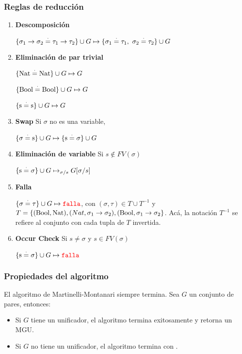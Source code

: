 \subsubsection{Reglas de reducción}

\begin{enumerate}
\item \textbf{Descomposición}

$\{\sigma_1\to\sigma_2 \overset{\cdot}{=}\tau_1\to\tau_2\}\cup G\mapsto \{\sigma_1\overset{\cdot}{=}\tau_1,~\sigma_2 \overset{\cdot}{=}\tau_2\}\cup G$
\item \textbf{Eliminación de par trivial}

$\{\operatorname{Nat} \overset{\cdot}{=}\operatorname{Nat}\}\cup G\mapsto G$

$\{\operatorname{Bool} \overset{\cdot}{=}\operatorname{Bool}\}\cup G\mapsto G$

$\{\text{s} \overset{\cdot}{=}\text{s}\}\cup G\mapsto G$
\item \textbf{Swap} Si $\sigma$ no es una variable,

$\{\sigma \overset{\cdot}{=}\text{s}\}\cup G\mapsto \{\text{s}\overset{\cdot}{=}\sigma\}\cup G$

\item \textbf{Eliminación de variable} Si $s\notin FV(\sigma)$

$\{\text{s}\overset{\cdot}{=}\sigma\}\cup G\mapsto_{\sigma/s} G[\sigma/s]$

\item \textbf{Falla}

$\{\sigma\overset{\cdot}{=}\tau\}\cup G\mapsto {\color{red}\texttt{falla}}$, con $(\sigma,\tau)\in T\cup T^{-1}$ y $T =\{(\operatorname{Bool},\operatorname{Nat}), (Nat, \sigma_1\to\sigma_2), (\operatorname{Bool}, \sigma_1\to\sigma_2\}$. Acá, la notación $T^{-1}$ se refiere al conjunto con cada tupla de $T$ invertida.

\item \textbf{Occur Check} Si $s\neq\sigma$ y $s\in FV(\sigma)$

$\{\text{s}\overset{\cdot}{=}\sigma\}\cup G\mapsto {\color{red}\texttt{falla}}$
\end{enumerate}

\subsubsection{Propiedades del algoritmo}
El algoritmo de Martinelli-Montanari siempre termina. Sea $G$ un conjunto de pares, entonces:
\begin{itemize}
\item Si $G$ tiene un unificador, el algoritmo termina exitosamente y retorna un MGU.
\item Si $G$ no tiene un unificador, el algoritmo termina con .
\end{itemize}

